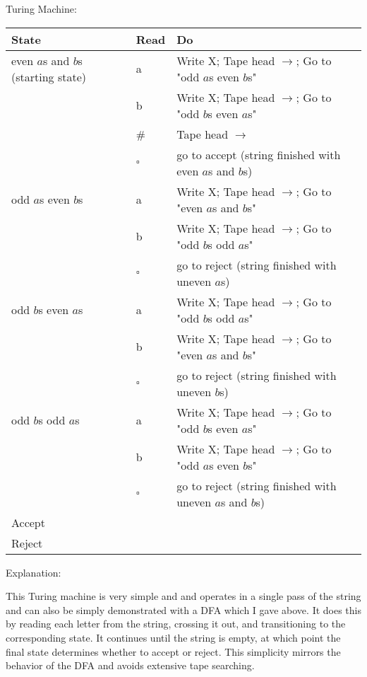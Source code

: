 \documentclass[11pt, letterpaper]{article}
\begin{document}
\vspace{5mm}

\newpage

\noindent Turing Machine:

\vspace{1mm}

\noindent\begin{tabularx}{\textwidth} { 
  | >{\centering\arraybackslash}X 
  | >{\centering\arraybackslash}X 
  | >{\centering\arraybackslash}X | }
 \hline
 \rowcolor{lightgray} State & Read & Do \\
\hline
even $a$s and $b$s (starting state) & a & Write X; Tape head $\rightarrow$; Go to "odd $a$s even $b$s"  \\
 \hline
 & b & Write X; Tape head $\rightarrow$; Go to "odd $b$s even $a$s"  \\
  \hline
 & \# & Tape head $\rightarrow$  \\
\hline
 & $\square$ & go to accept (string finished with even $a$s and $b$s)  \\
\hline
odd $a$s even $b$s & a & Write X; Tape head $\rightarrow$; Go to "even $a$s and $b$s"  \\
\hline
 & b & Write X; Tape head $\rightarrow$; Go to "odd $b$s odd $a$s" \\
\hline
 & $\square$ & go to reject (string finished with uneven $a$s)  \\
\hline
odd $b$s even $a$s & a & Write X; Tape head $\rightarrow$; Go to "odd $b$s odd $a$s"  \\
\hline
 & b & Write X; Tape head $\rightarrow$; Go to "even $a$s and $b$s" \\
\hline
 & $\square$ & go to reject (string finished with uneven $b$s) \\
\hline
odd $b$s odd $a$s & a & Write X; Tape head $\rightarrow$; Go to "odd $b$s even $a$s" \\
\hline
 & b & Write X; Tape head $\rightarrow$; Go to "odd $a$s even $b$s" \\
\hline
 & $\square$ & go to reject (string finished with uneven $a$s and $b$s)  \\
\hline
Accept &  &   \\
\hline
Reject &  &  \\
\hline
\end{tabularx}

\vspace{5mm}

\noindent Explanation:

\vspace{5mm}

\noindent This Turing machine is very simple and and operates in a single pass of the string and can also be simply demonstrated with a DFA which I gave above. It does this by reading each letter from the string, crossing it out, and transitioning to the corresponding state. It continues until the string is empty, at which point the final state determines whether to accept or reject. This simplicity mirrors the behavior of the DFA and avoids extensive tape searching.
\end{document}

